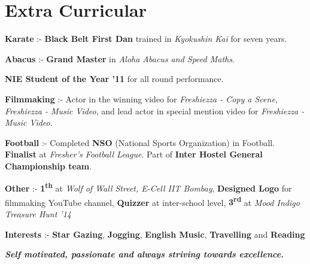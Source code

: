 \documentclass[11pt]{resume}
\begin{document}
\begin{resume}
\begin{list2}
\end{list2}



\vspace{-1em}


\section{\mysidestyle Extra Curricular}
\begin{list2}
\item \textbf {Karate} :- \textbf{Black Belt First Dan} trained in \textsl{Kyokushin Kai} for seven years. 
\item \textbf {Abacus} :- \textbf{Grand Master} in \textsl{Aloha Abacus and Speed Maths}. 
\item \textbf {NIE Student of the Year '11} for all round performance. 
\item \textbf {Filmmaking} :- Actor in the winning video for \textsl{Freshiezza - Copy a Scene}, \textsl{Freshiezza - Music Video}, and lead actor in special mention video for \textsl{Freshiezza - Music Video}.

\item \textbf {Football} :- Completed \textbf{NSO} (National Sports Organization) in Football. \textbf{Finalist} at \textsl{Fresher's Football League}. Part of \textbf{Inter Hostel General Championship team}.
\item \textbf {Other} :- \textbf{1\textsuperscript{th}} at \textsl {Wolf of Wall Street, E-Cell IIT Bombay}, \textbf{Designed Logo} for filmmaking YouTube channel, \textbf{Quizzer} at inter-school level, \textbf{3\textsuperscript{rd}} at \textsl{Mood Indigo Treasure Hunt '14}
\item \textbf {Interests} :- \textbf{Star Gazing}, \textbf{Jogging}, \textbf{English Music}, \textbf{Travelling} and \textbf{Reading}

\end{list2}
\textit{\textbf{Self motivated, passionate and always striving towards excellence.}}


    

\end{resume}
\end{document}
